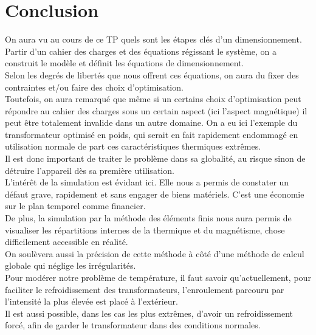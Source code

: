 \section{Conclusion}
On aura vu au cours de ce TP quels sont les étapes clés d'un dimensionnement.\\
Partir d'un cahier des charges et des équations régissant le système, on a construit le modèle et définit les équations de dimensionnement.\\
Selon les degrés de libertés que nous offrent ces équations, on aura du fixer des contraintes et/ou faire des choix d'optimisation.\\

Toutefois, on aura remarqué que même si un certains choix d'optimisation peut répondre au cahier des charges sous un certain aspect (ici l'aspect magnétique) il peut être totalement invalide dans un autre domaine. On a eu ici l'exemple du transformateur optimisé en poids, qui serait en fait rapidement endommagé en utilisation normale de part ces caractéristiques thermiques extrêmes.\\
Il est donc important de traiter le problème dans sa globalité, au risque sinon de détruire l'appareil dès sa première utilisation.\\

L'intérêt de la simulation est évidant ici. Elle nous a permis de constater un défaut grave, rapidement et sans engager de biens matériels. C'est une économie sur le plan temporel comme financier.\\
De plus, la simulation par la méthode des éléments finis nous aura permis de visualiser les répartitions internes de la thermique et du magnétisme, chose difficilement accessible en réalité.\\
On soulèvera aussi la précision de cette méthode à côté d'une méthode de calcul globale qui néglige les irrégularités.\\

Pour modérer notre problème de température, il faut savoir qu'actuellement, pour faciliter le refroidissement des transformateurs, l’enroulement parcouru par l’intensité la plus élevée est placé à l’extérieur.\\
Il est aussi possible, dans les cas les plus extrêmes, d'avoir un refroidissement forcé, afin de garder le transformateur dans des conditions normales.